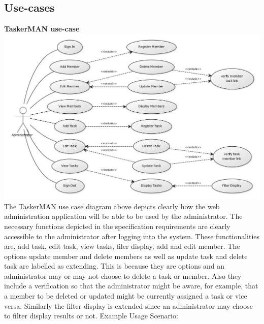 \documentclass{project}
\begin{document}
\subsection{Use-cases}
\textbf{TaskerMAN use-case} \\
\includegraphics[width=\textwidth]{images/5.1/TaskerMANUseCase}
The TaskerMAN use case diagram above depicts clearly how the web administration application will be able to be used by the administrator.  The necessary functions depicted in the specification requirements are clearly accessible to the administrator after logging into the system. These functionalities are, add task, edit task, view tasks, filer display, add and edit member. The options update member and delete members as well as update task and delete task are labelled as extending.  This is because they are options and an administrator may or may not choose to delete a task or member.  Also they include a verification so that the administrator might be aware, for example, that a member to be deleted or updated might be currently assigned a task or vice versa.  Similarly the filter display is extended since an administrator may choose to filter display results or not.
Example Usage Scenario:
\end{document}
